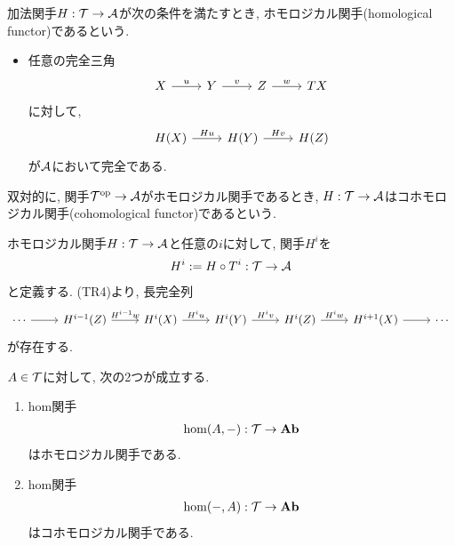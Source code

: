 \documentclass[uplatex, a4paper, 14Q, dvipdfmx]{jsarticle}
\begin{document}
\begin{definition}[(コ)ホモロジカル関手]
  加法関手$H: \mathcal{T} \to \mathcal{A}$が次の条件を満たすとき, ホモロジカル関手(homological functor)であるという. 
  \begin{itemize}
    \item 任意の完全三角
    \[\begin{tikzcd}
      X & Y & Z & TX
      \arrow["u", from=1-1, to=1-2]
      \arrow["v", from=1-2, to=1-3]
      \arrow["w", from=1-3, to=1-4]
    \end{tikzcd}\]
    に対して, 
    \[\begin{tikzcd}
      {H(X)} & {H(Y)} & {H(Z)}
      \arrow["Hu", from=1-1, to=1-2]
      \arrow["Hv", from=1-2, to=1-3]
    \end{tikzcd}\]
    が$\mathcal{A}$において完全である.  
  \end{itemize}
  双対的に, 関手$\mathcal{T}^{\mathrm{op}} \to \mathcal{A}$がホモロジカル関手であるとき, $H: \mathcal{T} \to \mathcal{A}$はコホモロジカル関手(cohomological functor)であるという. 
\end{definition}

\begin{remark} \label{homological_log_exact}
  ホモロジカル関手$H: \mathcal{T} \to \mathcal{A}$と任意の$i$に対して, 関手$H^i$を
  \begin{align*}
    H^i := H \circ T^i: \mathcal{T} \to \mathcal{A}
  \end{align*}
  と定義する. 
  (TR4)より, 長完全列
  \[\begin{tikzcd}
    \cdots & {H^{i-1}(Z)} & {H^i(X)} & {H^i(Y)} & {H^i(Z)} & {H^{i+1}(X)} & \cdots
    \arrow[from=1-1, to=1-2]
    \arrow["{H^{i-1}w}", from=1-2, to=1-3]
    \arrow["H^iu", from=1-3, to=1-4]
    \arrow["H^iv", from=1-4, to=1-5]
    \arrow["H^iw", from=1-5, to=1-6]
    \arrow[from=1-6, to=1-7]
  \end{tikzcd}\]
  が存在する. 
\end{remark}

\begin{theorem} \label{hom_homological}
  $A \in \mathcal{T}$に対して, 次の2つが成立する. 
  \begin{enumerate}
    \item hom関手
    \begin{align*}
      \hom(A, -): \mathcal{T} \to \mathbf{Ab}
    \end{align*}
    はホモロジカル関手である. 
    \item hom関手
    \begin{align*}
      \hom(-, A): \mathcal{T} \to \mathbf{Ab}
    \end{align*}
    はコホモロジカル関手である. 
  \end{enumerate}
\end{theorem}
\end{document}

